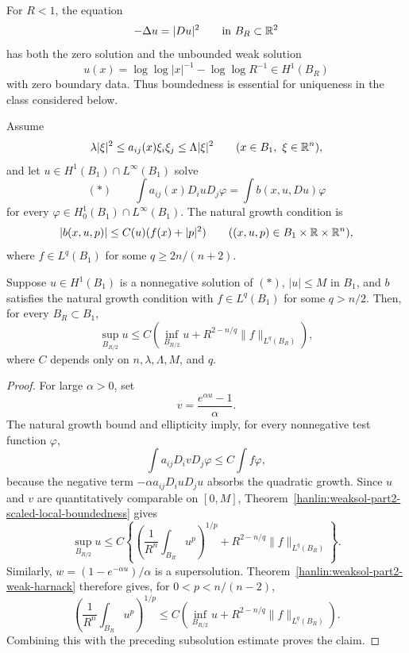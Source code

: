 \begin{example}\label{hanlin:weaksol-part2-nonlinear-counterexample}
For $R<1$, the equation
\[
-\Delta u=|Du|^2\qquad\text{in }B_R\subset\mathbb{R}^2
\]
has both the zero solution and the unbounded weak solution
\[
u(x)=\log\log|x|^{-1}-\log\log R^{-1}
\in H^1(B_R)
\]
with zero boundary data. Thus boundedness is essential for uniqueness in the
class considered below.
\end{example}

Assume
\[
\lambda|\xi|^2\leq a_{ij}(x)\xi_i\xi_j\leq\Lambda|\xi|^2
\qquad(x\in B_1,\ \xi\in\mathbb{R}^n),
\]
and let $u\in H^1(B_1)\cap L^\infty(B_1)$ solve
\[
(\ast)\qquad
\int a_{ij}(x)D_i uD_j\varphi
=\int b(x,u,Du)\varphi
\]
for every $\varphi\in H^1_0(B_1)\cap L^\infty(B_1)$. The natural growth
condition is
\[
|b(x,u,p)|\leq C(u)(f(x)+|p|^2)
\qquad((x,u,p)\in B_1\times\mathbb{R}\times\mathbb{R}^n),
\]
where $f\in L^q(B_1)$ for some $q\geq2n/(n+2)$.

\begin{lemma}\label{hanlin:weaksol-part2-nonlinear-harnack}
Suppose $u\in H^1(B_1)$ is a nonnegative solution of $(\ast)$,
$|u|\leq M$ in $B_1$, and $b$ satisfies the natural growth condition with
$f\in L^q(B_1)$ for some $q>n/2$. Then, for every $B_R\subset B_1$,
\[
\sup_{B_{R/2}}u
\leq C\left(\inf_{B_{R/2}}u
+R^{2-n/q}\|f\|_{L^q(B_R)}\right),
\]
where $C$ depends only on $n,\lambda,\Lambda,M$, and $q$.
\end{lemma}
\begin{proof}
\sketch For large $\alpha>0$, set
\[
v=\frac{e^{\alpha u}-1}{\alpha}.
\]
The natural growth bound and ellipticity imply, for every nonnegative test
function $\varphi$,
\begin{equation}
\int a_{ij}D_i vD_j\varphi\leq C\int f\varphi,
\end{equation}
because the negative term
$-\alpha a_{ij}D_i uD_j u$ absorbs the quadratic growth. Since $u$ and $v$
are quantitatively comparable on $[0,M]$,
Theorem~\ref{hanlin:weaksol-part2-scaled-local-boundedness} gives
\begin{equation}
\sup_{B_{R/2}}u
\leq C\left\{
\left(\frac1{R^n}\int_{B_R}u^p\right)^{1/p}
+R^{2-n/q}\|f\|_{L^q(B_R)}\right\}.
\end{equation}
Similarly, $w=(1-e^{-\alpha u})/\alpha$ is a supersolution.
Theorem~\ref{hanlin:weaksol-part2-weak-harnack}
therefore gives, for $0<p<n/(n-2)$,
\[
\left(\frac1{R^n}\int_{B_R}u^p\right)^{1/p}
\leq C\left(
\inf_{B_{R/2}}u+R^{2-n/q}\|f\|_{L^q(B_R)}\right).
\]
Combining this with the preceding subsolution estimate proves the claim.
\end{proof}

